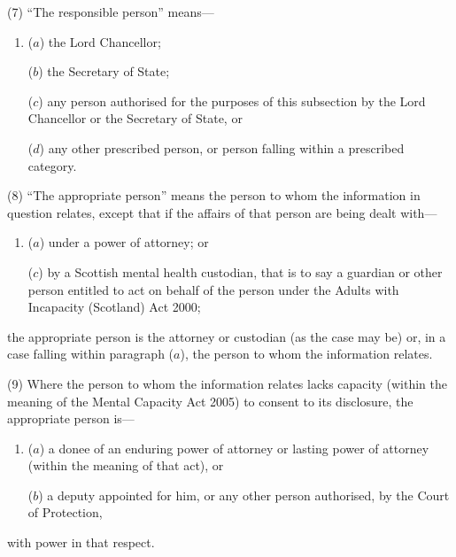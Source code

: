 \documentclass[12pt,a4paper]{article}
\begin{document}
(7) “The responsible person” means---
\begin{enumerate}\item[]
($a$) the Lord Chancellor;

($b$) the Secretary of State;

($c$) any person authorised for the purposes of this subsection by the Lord
Chancellor or the Secretary of State, or

($d$) any other prescribed person, or person falling within a prescribed
category.
\end{enumerate}

(8) “The appropriate person” means the person to whom the information in question relates, except that if the affairs of that person are being dealt with---
\begin{enumerate}\item[]
($a$) under a power of attorney; or

($c$) by a Scottish mental health custodian, that is to say a guardian or other person entitled to act on behalf of the person under the Adults with Incapacity (Scotland) Act 2000;
\end{enumerate}
the appropriate person is the attorney or custodian (as the case may be) or, in a case falling within paragraph ($a$), the person to whom the information relates.

(9) Where the person to whom the information relates lacks capacity (within the
meaning of the Mental Capacity Act 2005) to consent to its disclosure, the appropriate
person is---
\begin{enumerate}\item[]
($a$) a donee of an enduring power of attorney or lasting power of attorney (within the meaning of that act), or

($b$) a deputy appointed for him, or any other person authorised, by the Court of
Protection,
\end{enumerate}
with power in that respect.
\end{document}
